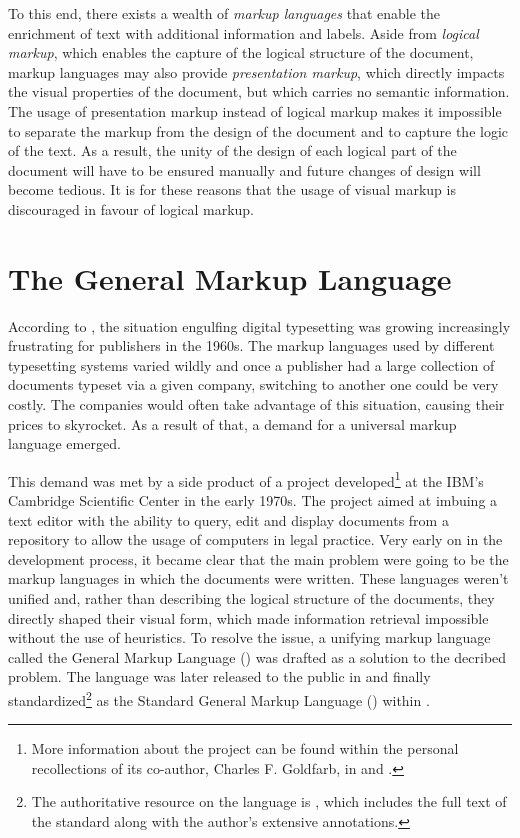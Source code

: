 \documentclass[b5paper]{book}
\begin{document}
      To this end, there exists a wealth of \emph{markup languages} that enable
      the enrichment of text with additional information and labels. Aside from
      \emph{logical markup}, which enables the capture of the logical structure
      of the document, markup languages may also provide \emph{presentation
      markup}, which directly impacts the visual properties of the document, but
      which carries no semantic information. The usage of presentation markup
      instead of logical markup makes it impossible to separate the markup from
      the design of the document and to capture the logic of the text. As a
      result, the unity of the design of each logical part of the document will
      have to be ensured manually and future changes of design will become
      tedious. It is for these reasons that the usage of visual markup is
      discouraged in favour of logical markup.

      \section{The General Markup Language}
        According to \cite{hlava11}, the situation engulfing digital typesetting
        was growing increasingly frustrating for publishers in the 1960s. The
        markup languages used by different typesetting systems varied wildly and
        once a publisher had a large collection of documents typeset via a given
        company, switching to another one could be very costly. The companies
        would often take advantage of this situation, causing their prices to
        skyrocket. As a result of that, a demand for a universal markup language
        emerged.

        This demand was met by a side product of a project developed\footnote{
          More information about the project can be found within the personal
          recollections of its co-author, Charles F. Goldfarb, in
          \cite{goldfarb96} and \cite{goldfarb97:whySGML}.
        } at the IBM's Cambridge Scientific Center in the early 1970s. The
        project aimed at imbuing a text editor with the ability to query, edit
        and display documents from a repository to allow the usage of computers
        in legal practice. Very early on in the development process, it became
        clear that the main problem were going to be the markup languages in
        which the documents were written. These languages weren't unified and,
        rather than describing the logical structure of the documents, they
        directly shaped their visual form, which made information retrieval
        impossible without the use of heuristics. To resolve the issue, a
        unifying markup language called the General Markup Language
        () was drafted as a solution to the decribed problem. The
        language was later released to the public in \cite{goldfarb81} and
        finally standardized\footnote{
          The authoritative resource on the  language is
          \cite{goldfarb91}, which includes the full text of the standard along
          with the author's extensive annotations.
        } as the Standard General Markup Language () within
        \cite{iso8879}.
\end{document}

